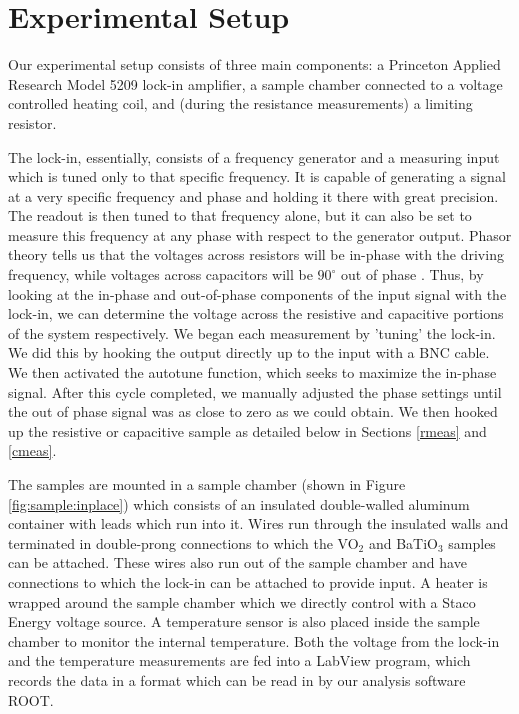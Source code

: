 \documentclass[%
 reprint,
 amsmath,amssymb,
 aps,
 pra,
]{revtex4-1}
\begin{document}
\section{Experimental Setup}

Our experimental setup consists of three main components: a Princeton Applied Research Model 5209 lock-in amplifier, a sample chamber connected to a voltage controlled heating coil, and (during the resistance measurements) a limiting resistor. 

The lock-in, essentially, consists of a frequency generator and a measuring input which is tuned only to that specific frequency. It is capable of generating a signal at a very specific frequency and phase and holding it there with great precision. The readout is then tuned to that frequency alone, but it can also be set to measure this frequency at any phase with respect to the generator output. Phasor theory tells us that the voltages across resistors  will be in-phase with the driving frequency, while voltages across capacitors will be $90^\circ$ out of phase \cite{manual}. Thus, by looking at the in-phase and out-of-phase components of the input signal with the lock-in, we can determine the voltage across the resistive and capacitive portions of the system respectively. We began each measurement by 'tuning' the lock-in. We did this by hooking the output directly up to the input with a BNC cable. We then activated the autotune function, which seeks to maximize the in-phase signal. After this cycle completed, we manually adjusted the phase settings until the out of phase signal was as close to zero as we could obtain. We then hooked up the resistive or capacitive sample as detailed below in Sections \ref{rmeas} and \ref{cmeas}.

The samples are mounted in a sample chamber (shown in Figure \ref{fig:sample:inplace}) which consists of an insulated double-walled aluminum container with leads which run into it. Wires run through the insulated walls and terminated in double-prong connections to which the VO$_2$ and BaTiO$_3$ samples can be attached. These wires also run out of the sample chamber and have connections to which the lock-in can be attached to provide input. A heater is wrapped around the sample chamber which we directly control with a Staco Energy voltage source. A temperature sensor is also placed inside the sample chamber to monitor the internal temperature. Both the voltage from the lock-in and the temperature measurements are fed into a LabView program, which records the data in a format which can be read in by our analysis software ROOT.
\end{document}
